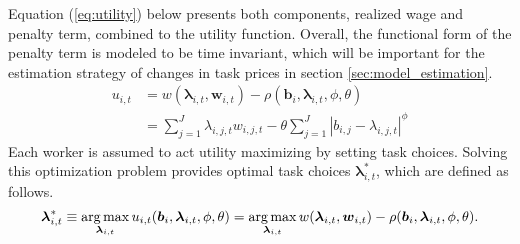 \documentclass[../main.tex]{subfiles}
\begin{document}
Equation (\ref{eq:utility}) below presents both components, realized wage and penalty term, combined to the utility function. Overall, the functional form of the penalty term is modeled to be time invariant, which will be important for the estimation strategy of changes in task prices in section \ref{sec:model_estimation}.
\begin{align}\label{eq:utility}
	u_{i,t} &= w(\boldsymbol{\lambda}_{i,t}, \boldsymbol{w}_{i,t}) - \rho(\boldsymbol{b}_i, \boldsymbol{\lambda}_{i,t}, \phi, \theta)  \\
	{}		&= \sum^J_{j=1} \lambda_{i,j,t} w_{i,j,t} - \theta \sum^J_{j=1} |b_{i,j} - \lambda_{i,j,t}|^\phi \nonumber
\end{align}
Each worker is assumed to act utility maximizing by setting task choices. Solving this optimization problem provides optimal task choices $\boldsymbol{\lambda}^*_{i, t}$, which are defined as follows.
\begin{equation} \label{eq:optimization_problem}
	\boldsymbol{\lambda}^*_{i, t} \equiv \operatorname*{arg\,max}_{\boldsymbol{\lambda}_{i, t}} u_{i,t}(\boldsymbol{b}_i, \boldsymbol{\lambda}_{i, t}, \phi, \theta) = \operatorname*{arg\,max}_{\boldsymbol{\lambda}_{i, t}} w(\boldsymbol{\lambda}_{i,t}, \boldsymbol{w}_{i,t}) - \rho(\boldsymbol{b}_i, \boldsymbol{\lambda}_{i,t}, \phi, \theta).
\end{equation}
\end{document}
